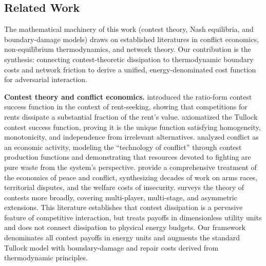 \documentclass[11pt]{article}
\theoremstyle{plain}
\theoremstyle{definition}
\theoremstyle{remark}
\let\origsubsection\subsection
\renewcommand{\subsection}{\needspace{7\baselineskip}\origsubsection}
\begin{document}
\subsection{Related Work}\label{related-work}

The mathematical machinery of this work (contest theory, Nash
equilibria, and boundary-damage models) draws on established literatures
in conflict economics, non-equilibrium thermodynamics, and network
theory. Our contribution is the synthesis: connecting contest-theoretic
dissipation to thermodynamic boundary costs and network friction to
derive a unified, energy-denominated cost function for adversarial
interaction.

\textbf{Contest theory and conflict economics.} \citet{Tullock1980}
introduced the ratio-form contest success function in the context of
rent-seeking, showing that competitions for rents dissipate a
substantial fraction of the rent's value. \citet{Skaperdas1996}
axiomatized the Tullock contest success function, proving it is the
unique function satisfying homogeneity, monotonicity, and independence
from irrelevant alternatives. \citet{Hirshleifer1991} analyzed conflict
as an economic activity, modeling the ``technology of conflict'' through
contest production functions and demonstrating that resources devoted to
fighting are pure waste from the system's perspective.
\citet{GarfinkelSkaperdas2012} provide a comprehensive treatment of the
economics of peace and conflict, synthesizing decades of work on arms
races, territorial disputes, and the welfare costs of insecurity.
\citet{Konrad2009} surveys the theory of contests more broadly, covering
multi-player, multi-stage, and asymmetric extensions. This literature
establishes that contest dissipation is a pervasive feature of
competitive interaction, but treats payoffs in dimensionless utility
units and does not connect dissipation to physical energy budgets. Our
framework denominates all contest payoffs in energy units and augments
the standard Tullock model with boundary-damage and repair costs derived
from thermodynamic principles.
\end{document}
